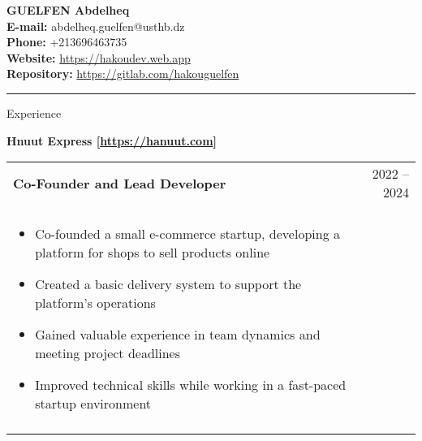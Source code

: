 \documentclass[a4paper,portrait,margin=0.5in]{article}
\begin{document}
\begin{minipage}{0.5\textwidth}
    \begin{flushleft}
        \textbf{GUELFEN Abdelheq} \\
        \textbf{E-mail:} abdelheq.guelfen@usthb.dz \\
        \textbf{Phone:} +213696463735 \\
        \textbf{Website:} \url{https://hakoudev.web.app} \\
        \textbf{Repository:} \url{https://gitlab.com/hakouguelfen} \\
    \end{flushleft}
\end{minipage}

\rule{\linewidth}{1pt} %


\begin{minipage}[t]{\linewidth}
  Experience
\end{minipage}

\textbf{Hnuut Express [\url{https://hanuut.com}]}\\
\begin{tabularx}{\textwidth}{@{}L R@{}}
  \toprule
  \textbf{Co-Founder and Lead Developer} & 2022 -- 2024\\\\

  \begin{minipage}[t]{\linewidth}
    \begin{itemize}
      \item Co-founded a small e-commerce startup, developing a platform for shops to sell products online
      \item Created a basic delivery system to support the platform's operations
      \item Gained valuable experience in team dynamics and meeting project deadlines
      \item Improved technical skills while working in a fast-paced startup environment
    \end{itemize}
  \end{minipage} \\\\
\end{tabularx}
\end{document}

